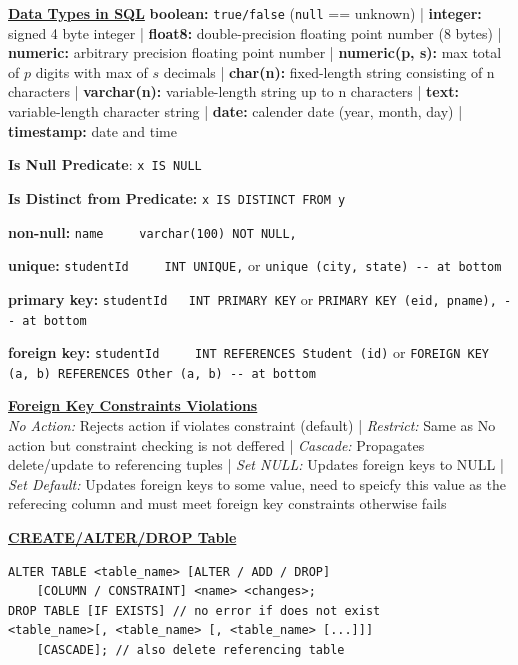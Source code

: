\documentclass[10pt,landscape]{article}
\begin{document}
\begin{multicols*}{3}
\textbf{\underline{Data Types in SQL}}
\textbf{boolean:} \verb|true/false| (\verb|null| == unknown) | \textbf{integer:} signed 4 byte integer
| \textbf{float8:} double-precision floating point number (8 bytes) | \textbf{numeric:} arbitrary precision floating point number 
| \textbf{numeric(p, s):} max total of $p$ digits with max of $s$ decimals | \textbf{char(n):} fixed-length string consisting of n characters
| \textbf{varchar(n):} variable-length string up to n characters | \textbf{text:} variable-length character string
| \textbf{date:} calender date (year, month, day) | \textbf{timestamp:} date and time 

\textbf{Is Null Predicate}: \verb|x IS NULL|

\textbf{Is Distinct from Predicate:} \verb|x IS DISTINCT FROM y|

\textbf{non-null:} \verb|name     varchar(100) NOT NULL,|

\textbf{unique:} \verb|studentId     INT UNIQUE,| or
\verb|unique (city, state) -- at bottom|

\textbf{primary key:}
\verb|studentId   INT PRIMARY KEY|
or \verb|PRIMARY KEY (eid, pname), -- at bottom|

\textbf{foreign key:} \verb|studentId     INT REFERENCES Student (id)|
or \verb|FOREIGN KEY (a, b) REFERENCES Other (a, b) -- at bottom|

\textbf{\underline{Foreign Key Constraints Violations}} \\ 
\textit{No Action:} Rejects action if violates constraint (default) | \textit{Restrict:} Same as No action but constraint checking is not deffered
| \textit{Cascade:} Propagates delete/update to referencing tuples | \textit{Set NULL:} Updates foreign keys to NULL
| \textit{Set Default:} Updates foreign keys to some value, need to speicfy this value as the referecing column 
and must meet foreign key constraints otherwise fails


\textbf{\underline{CREATE/ALTER/DROP Table}}
\begin{lstlisting}
ALTER TABLE <table_name> [ALTER / ADD / DROP] 
    [COLUMN / CONSTRAINT] <name> <changes>;
DROP TABLE [IF EXISTS] // no error if does not exist
<table_name>[, <table_name> [, <table_name> [...]]] 
    [CASCADE]; // also delete referencing table
\end{lstlisting}



\end{multicols*}
\end{document}
